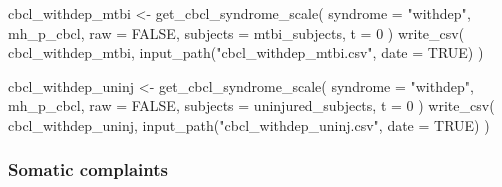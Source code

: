 \documentclass[
  letterpaper,
  DIV=11,
  numbers=noendperiod]{scrreprt}
\newenvironment{Shaded}{\begin{snugshade}}{\end{snugshade}}
\newcommand{\AttributeTok}[1]{\textcolor[rgb]{0.40,0.45,0.13}{#1}}
\newcommand{\ConstantTok}[1]{\textcolor[rgb]{0.56,0.35,0.01}{#1}}
\newcommand{\DecValTok}[1]{\textcolor[rgb]{0.68,0.00,0.00}{#1}}
\newcommand{\FunctionTok}[1]{\textcolor[rgb]{0.28,0.35,0.67}{#1}}
\newcommand{\NormalTok}[1]{\textcolor[rgb]{0.00,0.23,0.31}{#1}}
\newcommand{\OtherTok}[1]{\textcolor[rgb]{0.00,0.23,0.31}{#1}}
\newcommand{\StringTok}[1]{\textcolor[rgb]{0.13,0.47,0.30}{#1}}
\begin{document}
\begin{Shaded}
\begin{Highlighting}[]
\NormalTok{cbcl\_withdep\_mtbi }\OtherTok{\textless{}{-}} \FunctionTok{get\_cbcl\_syndrome\_scale}\NormalTok{(}
    \AttributeTok{syndrome =} \StringTok{"withdep"}\NormalTok{,}
\NormalTok{    mh\_p\_cbcl,}
    \AttributeTok{raw =} \ConstantTok{FALSE}\NormalTok{,}
    \AttributeTok{subjects =}\NormalTok{ mtbi\_subjects,}
    \AttributeTok{t =} \DecValTok{0}
\NormalTok{)}
\FunctionTok{write\_csv}\NormalTok{(}
\NormalTok{    cbcl\_withdep\_mtbi,}
    \FunctionTok{input\_path}\NormalTok{(}\StringTok{"cbcl\_withdep\_mtbi.csv"}\NormalTok{, }\AttributeTok{date =} \ConstantTok{TRUE}\NormalTok{)}
\NormalTok{)}

\NormalTok{cbcl\_withdep\_uninj }\OtherTok{\textless{}{-}} \FunctionTok{get\_cbcl\_syndrome\_scale}\NormalTok{(}
    \AttributeTok{syndrome =} \StringTok{"withdep"}\NormalTok{,}
\NormalTok{    mh\_p\_cbcl,}
    \AttributeTok{raw =} \ConstantTok{FALSE}\NormalTok{,}
    \AttributeTok{subjects =}\NormalTok{ uninjured\_subjects,}
    \AttributeTok{t =} \DecValTok{0}
\NormalTok{)}
\FunctionTok{write\_csv}\NormalTok{(}
\NormalTok{    cbcl\_withdep\_uninj,}
    \FunctionTok{input\_path}\NormalTok{(}\StringTok{"cbcl\_withdep\_uninj.csv"}\NormalTok{, }\AttributeTok{date =} \ConstantTok{TRUE}\NormalTok{)}
\NormalTok{)}
\end{Highlighting}
\end{Shaded}

\subsubsection{Somatic complaints}\label{somatic-complaints}
\end{document}
